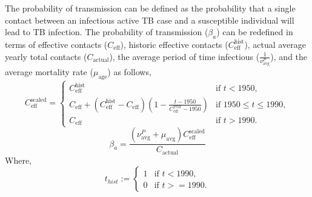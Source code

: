 \documentclass[11pt,twoside]{bristolthesis}
\begin{document}
  The probability of transmission can be defined as the probability that a single contact between an infectious active TB case and a susceptible individual will lead to TB infection. The probability of transmission (\(\beta_a\)) can be redefined in terms of effective contacts (\(C_{\text{eff}}\)), historic effective contacts (\(C^{\text{hist}}_{\text{eff}}\)), actual average yearly total contacts (\(C_{\text{actual}}\)), the average period of time infectious (\(\frac{1}{\nu_{\text{avg}}^{P}}\)), and the average mortality rate (\(\mu_{\text{age}}\)) as follows,
  \begin{equation}
  C^{\text{scaled}}_{\text{eff}} = \begin{cases}
  C^{\text{hist}}_{\text{eff}} & \text{if } t < 1950, \\
  C_{\text{eff}} + \left(C^{\text{hist}}_{\text{eff}} -  C_{\text{eff}} \right) \left(1 - \frac{t-1950}{C^{\text{year}}_{\text{eff}}-1950}\right) & \text{if } 1950 \leq t \leq 1990, \\
  C_{\text{eff}} & \text{if } t > 1990. \end{cases}
    \label{eq:scaled-contacts}
  \end{equation}
  \begin{equation}
  \beta_a = \frac{(\nu_{\text{avg}}^{P} + \mu_{\text{avg}}) C^{\text{scaled}}_{\text{eff}}}{C_{\text{actual}}}
  \label{eq:beta-eq}
  \end{equation}
  Where,
  \begin{equation}
  t_{hist}  := \begin{cases}
  1 & \text{if } t < 1990, \\
  0 & \text{if } t >= 1990. \end{cases}
  \end{equation}
\end{document}
